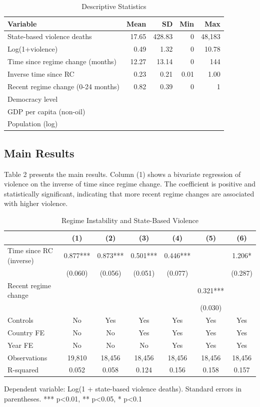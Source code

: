 \documentclass[12pt]{article}
\begin{document}
\begin{table}[h]
\centering
\caption{Descriptive Statistics}
\label{tab:desc}
\begin{tabular}{lrrrr}
\toprule
Variable & Mean & SD & Min & Max \\
\midrule
State-based violence deaths & 17.65 & 428.83 & 0 & 48,183 \\
Log(1+violence) & 0.49 & 1.32 & 0 & 10.78 \\
Time since regime change (months) & 12.27 & 13.14 & 0 & 144 \\
Inverse time since RC & 0.23 & 0.21 & 0.01 & 1.00 \\
Recent regime change (0-24 months) & 0.82 & 0.39 & 0 & 1 \\
Democracy level & & & & \\
GDP per capita (non-oil) & & & & \\
Population (log) & & & & \\
\bottomrule
\end{tabular}
\end{table}

\subsection{Main Results}

Table 2 presents the main results. Column (1) shows a bivariate regression of violence on the inverse of time since regime change. The coefficient is positive and statistically significant, indicating that more recent regime changes are associated with higher violence.

\begin{table}[h]
\centering
\caption{Regime Instability and State-Based Violence}
\label{tab:main}
\begin{tabular}{lcccccc}
\toprule
 & (1) & (2) & (3) & (4) & (5) & (6) \\
\midrule
Time since RC (inverse) & 0.877*** & 0.873*** & 0.501*** & 0.446*** & & 1.206* \\
 & (0.060) & (0.056) & (0.051) & (0.077) & & (0.287) \\
Recent regime change & & & & & 0.321*** & \\
 & & & & & (0.030) & \\
Controls & No & Yes & Yes & Yes & Yes & Yes \\
Country FE & No & No & Yes & Yes & Yes & Yes \\
Year FE & No & No & No & Yes & Yes & Yes \\
\midrule
Observations & 19,810 & 18,456 & 18,456 & 18,456 & 18,456 & 18,456 \\
R-squared & 0.052 & 0.058 & 0.124 & 0.156 & 0.158 & 0.157 \\
\bottomrule
\end{tabular}
\vspace{2mm}
\small{Dependent variable: Log(1 + state-based violence deaths). Standard errors in parentheses. *** p<0.01, ** p<0.05, * p<0.1}
\end{table}
\end{document}
